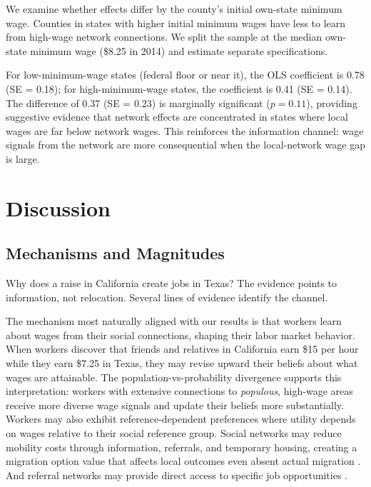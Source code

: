 \documentclass[12pt]{article}
\begin{document}
We examine whether effects differ by the county's initial own-state minimum wage. Counties in states with higher initial minimum wages have less to learn from high-wage network connections. We split the sample at the median own-state minimum wage (\$8.25 in 2014) and estimate separate specifications.

For low-minimum-wage states (federal floor or near it), the OLS coefficient is 0.78 (SE = 0.18); for high-minimum-wage states, the coefficient is 0.41 (SE = 0.14). The difference of 0.37 (SE = 0.23) is marginally significant ($p = 0.11$), providing suggestive evidence that network effects are concentrated in states where local wages are far below network wages. This reinforces the information channel: wage signals from the network are more consequential when the local-network wage gap is large.


\section{Discussion}
\label{sec:discussion}

\subsection{Mechanisms and Magnitudes}

Why does a raise in California create jobs in Texas? The evidence points to information, not relocation. Several lines of evidence identify the channel.

The mechanism most naturally aligned with our results is that workers learn about wages from their social connections, shaping their labor market behavior. When workers discover that friends and relatives in California earn \$15 per hour while they earn \$7.25 in Texas, they may revise upward their beliefs about what wages are attainable. The population-vs-probability divergence supports this interpretation: workers with extensive connections to \textit{populous}, high-wage areas receive more diverse wage signals and update their beliefs more substantially. Workers may also exhibit reference-dependent preferences where utility depends on wages relative to their social reference group. Social networks may reduce mobility costs through information, referrals, and temporary housing, creating a migration option value that affects local outcomes even absent actual migration \citep{munshi2003networks}. And referral networks may provide direct access to specific job opportunities \citep{kramarz2023}.
\end{document}
